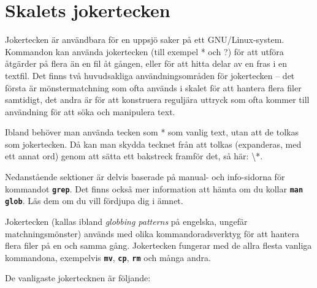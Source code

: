 \documentclass[10pt,a4paper,final]{book}
\newcommand{\xeng}[1]{\textit{#1} på engelska}
\newcommand{\xcommandstyle}[1]{\textbf{\texttt{#1}}}
\newcommand{\xcommand}[1]{\index{#1}\xcommandstyle{#1}}
\begin{document}
\section{Skalets jokertecken}

Jokertecken är användbara för en uppsjö saker på ett GNU/Linux-system. Kommandon kan använda jokertecken (till exempel * och ?) för att utföra åtgärder på flera än en fil åt gången, eller för att hitta delar av en fras i en textfil. Det finns två huvudsakliga användningsområden för jokertecken -- det första är mönstermatchning som ofta används i skalet för att hantera flera filer samtidigt, det andra är för att konstruera reguljära uttryck som ofta kommer till användning för att söka och manipulera text.

Ibland behöver man använda tecken som * som vanlig text, utan att de tolkas som jokertecken. Då kan man skydda tecknet från att tolkas (expanderas, med ett annat ord) genom att sätta ett bakstreck framför det, så här: \textbackslash{}*.

Nedanstående sektioner är delvis baserade på manual- och info-sidorna för kommandot \xcommand{grep}. Det finns också mer information att hämta om du kollar \xcommandstyle{man glob}. Läs dem om du vill fördjupa dig i ämnet.

Jokertecken (kallas ibland \xeng{globbing patterns}, ungefär matchningsmönster) används med olika kommandoradsverktyg för att hantera flera filer på en och samma gång. Jokertecken fungerar med de allra flesta vanliga kommandona, exempelvis \xcommand{mv}, \xcommand{cp}, \xcommand{rm} och många andra.

De vanligaste jokertecknen är följande:
\end{document}
